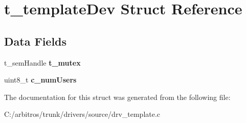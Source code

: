 \hypertarget{structt__template_dev}{\section{t\-\_\-template\-Dev Struct Reference}
\label{structt__template_dev}
}
\subsection*{Data Fields}
\begin{DoxyCompactItemize}
\item 
\hypertarget{structt__template_dev_a0f119a919d5e98b1d316a3b11cba4a12}{t\-\_\-sem\-Handle {\bfseries t\-\_\-mutex}}\label{structt__template_dev_a0f119a919d5e98b1d316a3b11cba4a12}

\item 
\hypertarget{structt__template_dev_a65907c8d88006e5cdc5e6b18eb4606ba}{uint8\-\_\-t {\bfseries c\-\_\-num\-Users}}\label{structt__template_dev_a65907c8d88006e5cdc5e6b18eb4606ba}

\end{DoxyCompactItemize}


The documentation for this struct was generated from the following file\-:\begin{DoxyCompactItemize}
\item 
C\-:/arbitros/trunk/drivers/source/drv\-\_\-template.\-c\end{DoxyCompactItemize}

